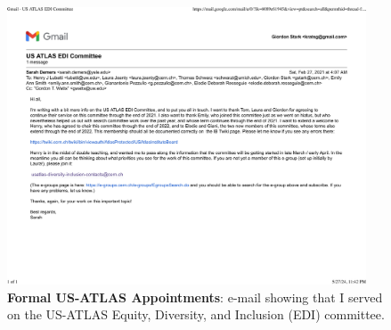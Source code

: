 \begin{figure}[h!]
	\centering
	\caption{\textbf{Formal US-ATLAS Appointments}: e-mail showing that I served on the US-ATLAS Equity, Diversity, and Inclusion (EDI) committee.}
	\includegraphics[width=0.95\textwidth]{attachments/F-leadership/usatlasEDICommittee}
\end{figure}

